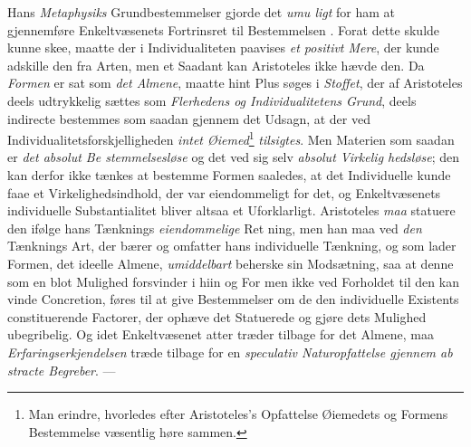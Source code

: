 Hans \emph{Metaphysiks} Grundbestemmelser gjorde det \emph{umu\-%
ligt} for ham at gjennemføre Enkeltvæsenets Fortrinsret til
Bestemmelsen . Forat dette skulde kunne skee, maatte
der i Individualiteten paavises \emph{et positivt Mere}, der kunde
adskille den fra Arten, men et Saadant kan Aristoteles ikke
hævde den. Da \emph{Formen} er sat som \emph{det Almene}, maatte
hint Plus søges i \emph{Stoffet}, der af Aristoteles deels udtrykkelig
sættes som \emph{Flerhedens og Individualitetens Grund},
deels indirecte bestemmes som saadan gjennem det Udsagn,
at der ved Individualitetsforskjelligheden \emph{intet Øiemed}\footnote{Man
erindre, hvorledes efter Aristoteles's Opfattelse Øiemedets og
Formens Bestemmelse væsentlig høre sammen.}
\emph{tilsigtes}. Men Materien som saadan er \emph{det absolut Be\-%
stemmelsesløse} og det ved sig selv \emph{absolut Virkelig\-%
hedsløse}; den kan derfor ikke tænkes at bestemme Formen
saaledes, at det Individuelle kunde faae et Virkelighedsindhold,
der var eiendommeligt for det, og Enkeltvæsenets individuelle
Substantialitet bliver altsaa et Uforklarligt. Aristoteles \emph{maa}
statuere den ifølge hans Tænknings \emph{eiendommelige} Ret\-%
ning, men han maa ved \emph{den} Tænknings Art, der bærer og
omfatter hans individuelle Tænkning, og som lader Formen,
det ideelle Almene, \emph{umiddelbart} beherske sin Modsætning,
saa at denne som en blot Mulighed forsvinder i hiin og For\-%
men ikke ved Forholdet til den kan vinde Concretion, føres
til at give Bestemmelser om de den individuelle Existents
constituerende Factorer, der ophæve det Statuerede og gjøre
dets Mulighed ubegribelig. Og idet Enkeltvæsenet atter træder
tilbage for det Almene, maa \emph{Erfaringserkjendelsen} træde
tilbage for en \emph{speculativ Naturopfattelse gjennem ab\-%
stracte Begreber}. ---

